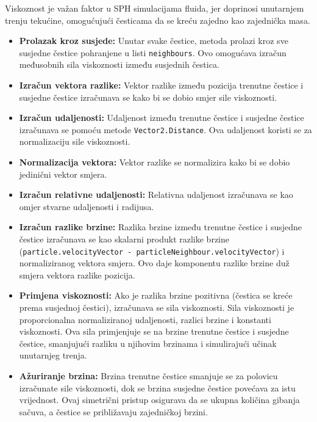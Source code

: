 \documentclass[diplomskirad]{fer}
\begin{document}
    Viskoznost je važan faktor u SPH simulacijama fluida, jer doprinosi unutarnjem trenju tekućine, omogućujući česticama da se kreću zajedno kao zajednička masa.

    \begin{itemize}
        \item \textbf{Prolazak kroz susjede:} Unutar svake čestice, metoda prolazi kroz sve susjedne čestice pohranjene u listi \texttt{neighbours}.
        Ovo omogućava izračun međusobnih sila viskoznosti između susjednih čestica.

        \item \textbf{Izračun vektora razlike:} Vektor razlike između pozicija trenutne čestice i susjedne čestice izračunava se kako bi se dobio smjer sile viskoznosti.

        \item \textbf{Izračun udaljenosti:} Udaljenost između trenutne čestice i susjedne čestice izračunava se pomoću metode \texttt{Vector2.Distance}.
        Ova udaljenost koristi se za normalizaciju sile viskoznosti.

        \item \textbf{Normalizacija vektora:} Vektor razlike se normalizira kako bi se dobio jedinični vektor smjera.

        \item \textbf{Izračun relativne udaljenosti:} Relativna udaljenost izračunava se kao omjer stvarne udaljenosti i radijusa.

        \item \textbf{Izračun razlike brzine:} Razlika brzine između trenutne čestice i susjedne čestice izračunava se kao skalarni produkt razlike brzine (\texttt{particle.velocityVector - particleNeighbour.velocityVector}) i normaliziranog vektora smjera.
        Ovo daje komponentu razlike brzine duž smjera vektora razlike pozicija.

        \item \textbf{Primjena viskoznosti:} Ako je razlika brzine pozitivna (čestica se kreće prema susjednoj čestici), izračunava se sila viskoznosti.
        Sila viskoznosti je proporcionalna normaliziranoj udaljenosti, razlici brzine i konstanti viskoznosti.
        Ova sila primjenjuje se na brzine trenutne čestice i susjedne čestice, smanjujući razliku u njihovim brzinama i simulirajući učinak unutarnjeg trenja.

        \item \textbf{Ažuriranje brzina:} Brzina trenutne čestice smanjuje se za polovicu izračunate sile viskoznosti, dok se brzina susjedne čestice povećava za istu vrijednost.
        Ovaj simetrični pristup osigurava da se ukupna količina gibanja sačuva, a čestice se približavaju zajedničkoj brzini.
    \end{itemize}
\end{document}
